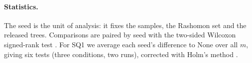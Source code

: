 \paragraph{Statistics.} The seed is the unit of analysis: it fixes the samples, the Rashomon set and the released trees. Comparisons are paired by seed with the two-sided Wilcoxon signed-rank test \citep{wilcoxon1945individual}. For SQ1 we average each seed's difference to None over all $m$, giving six tests (three conditions, two runs), corrected with Holm's method \citep{holm1979multiple}.
